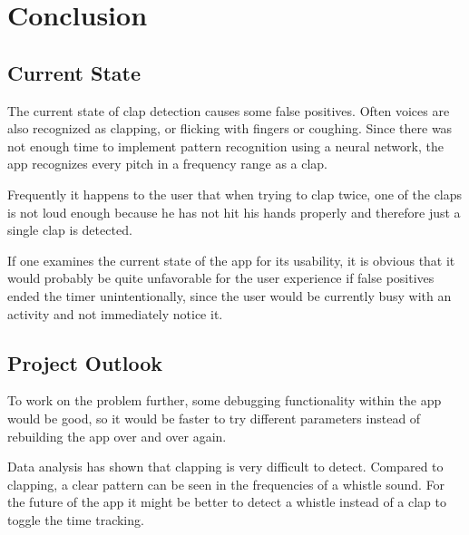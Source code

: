 \chapter{Conclusion}

\section{Current State}


The current state of clap detection causes some false positives. 
Often voices are also recognized as clapping, or flicking with fingers or coughing.
Since there was not enough time to implement pattern recognition using a neural network, the app recognizes every pitch in a frequency range as a clap.

Frequently it happens to the user that when trying to clap twice, one of the claps is not loud enough because he has not hit his hands properly and therefore just
a single clap is detected.

If one examines the current state of the app for its usability, it is obvious that it would probably be quite unfavorable for the user experience if false positives ended the timer unintentionally, since the user would be currently busy with an activity and not immediately notice it.



\section{Project Outlook}
\label{sec:orgfa9fd4b}


To work on the problem further, some debugging functionality within the app would be good, so it would be faster to try different parameters instead of rebuilding the app over and over again.

Data analysis has shown that clapping is very difficult to detect. Compared to clapping, a clear pattern can be seen in the frequencies of a whistle sound. For the future of the app it might be better to detect a whistle instead of a clap to toggle the time tracking.
